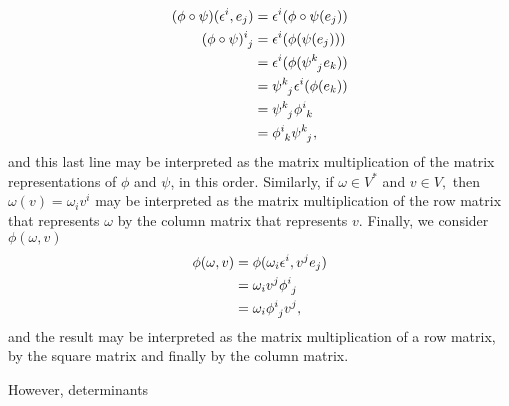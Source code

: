 \begin{remark}
    \begin{align*}
        (\phi\circ\psi)(\epsilon^i, e_j) &= \epsilon^i(\phi\circ\psi(e_j))\\
        (\phi \circ \psi)\indices{^i_j} &= \epsilon^i(\phi(\psi(e_j)))\\
                                         &= \epsilon^i(\phi(\psi\indices{^k_j}e_k))\\
                                         &= \psi\indices{^k_j}\epsilon^i(\phi(e_k))\\
                                         &= \psi\indices{^k_j}\phi\indices{^i_k}\\
                                         &= \phi\indices{^i_k}\psi\indices{^k_j},
    \end{align*}
    and this last line may be interpreted as the matrix multiplication of the matrix representations of \(\phi\) and \(\psi\), in this order. Similarly, if \(\omega \in V ^{\ast}\) and \(v \in V,\) then \(\omega(v) = \omega_i v^i\) may be interpreted as the matrix multiplication of the row matrix that represents \(\omega\) by the column matrix that represents \(v\). Finally, we consider \(\phi(\omega, v)\)
    \begin{align*}
        \phi(\omega, v) &= \phi(\omega_i \epsilon^i, v^je_j)\\
                        &= \omega_i v^j \phi\indices{^i_j}\\
                        &= \omega_i \phi\indices{^i_j} v^j,
    \end{align*}
    and the result may be interpreted as the matrix multiplication of a row matrix, by the square matrix and finally by the column matrix.

    However, determinants
\end{remark}
